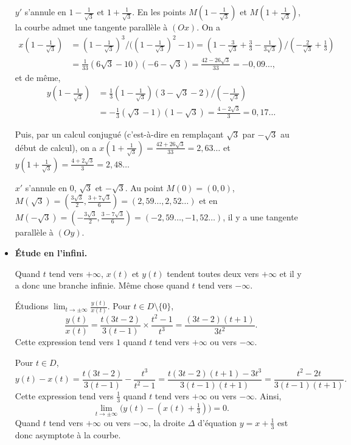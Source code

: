 \documentclass[class=report,crop=false]{standalone}
\begin{document}
\begin{exemple}
\begin{itemize}
$y'$ s'annule en $1-\frac{1}{\sqrt{3}}$ et $1+\frac{1}{\sqrt{3}}$.
En les points $M(1-\frac{1}{\sqrt{3}})$ et $M(1+\frac{1}{\sqrt{3}})$, la
courbe admet une tangente parallèle à $(Ox)$. On a
\begin{align*}
x\left(1-\tfrac{1}{\sqrt{3}}\right)&=\left(1-\tfrac{1}{\sqrt{3}}\right)^3/\Big(\left(1-\tfrac{1}{\sqrt{3}}\right)^2-1\Big)
=\left(1-\tfrac{3}{\sqrt{3}}+\tfrac{3}{3}-\tfrac{1}{3\sqrt{3}}\right)/\left(-\tfrac{2}{\sqrt{3}}+\tfrac{1}{3}\right)\\
 &=\tfrac{1}{33}\left(6\sqrt{3}-10\right)\left(-6-\sqrt{3}\right)=\frac{42-26\sqrt{3}}{33}=-0,09\ldots,
\end{align*}
et de même,
\begin{align*}
y\left(1-\tfrac{1}{\sqrt{3}}\right)
&=\tfrac{1}{3}\left(1-\tfrac{1}{\sqrt{3}}\right)\left(3-\sqrt{3}-2\right)/\left(-\tfrac{1}{\sqrt{3}}\right)\\
&=-\tfrac{1}{3}\left(\sqrt{3}-1\right)\left(1-\sqrt{3}\right)=\frac{4-2\sqrt{3}}{3}=0,17\ldots
\end{align*}

Puis, par un calcul conjugué (c'est-à-dire en remplaçant $\sqrt{3}$
par $-\sqrt{3}$ au début de calcul), on a
$x(1+\frac{1}{\sqrt{3}})=\frac{42+26\sqrt{3}}{33}
=2,63\ldots$ et $y(1+\frac{1}{\sqrt{3}})=\frac{4+2\sqrt{3}}{3}=2,48\ldots$

\medskip

$x'$ s'annule en $0$, $\sqrt{3}$ et $-\sqrt{3}$. Au point
$M(0)=(0,0)$, $M(\sqrt{3})=(\frac{3\sqrt{3}}{2},\frac{3+7\sqrt{3}}{6})
=(2,59\ldots,2,52\ldots)$ et en
$M(-\sqrt{3})=(-\frac{3\sqrt{3}}{2},\frac{3-7\sqrt{3}}{6})
=(-2,59\ldots,-1,52\ldots)$, il y a une tangente parallèle à $(Oy)$.


\item \textbf{Étude en l'infini.}

Quand $t$ tend vers $+\infty$, $x(t)$ et $y(t)$ tendent
toutes deux vers $+\infty$ et il y a donc une branche infinie.
Même chose quand $t$ tend vers $-\infty$.

Étudions $\lim_{t \to \pm\infty}\frac{y(t)}{x(t)}$.
Pour $t\in D\setminus\{0\}$,
$$\frac{y(t)}{x(t)}
=\frac{t(3t-2)}{3(t-1)}\times\frac{t^2-1}{t^3}=\frac{(3t-2)(t+1)}{3t^2}.$$
Cette expression tend vers $1$ quand $t$ tend vers $+\infty$ ou
vers $-\infty$.

Pour $t\in D$,
$$y(t)-x(t)=\frac{t(3t-2)}{3(t-1)}-\frac{t^3}{t^2-1}
=\frac{t(3t-2)(t+1)-3t^3}{3(t-1)(t+1)}=\frac{t^2-2t}{3(t-1)(t+1)}.$$
Cette expression tend vers $\frac{1}{3}$
quand $t$ tend vers $+\infty$ ou vers $-\infty$. Ainsi,
$$\lim_{t\rightarrow\pm\infty}\big(y(t)-(x(t)+\tfrac{1}{3})\big)=0.$$
Quand $t$ tend vers $+\infty$ ou vers $-\infty$, la droite
$\Delta$ d'équation $y=x+\frac{1}{3}$ est donc asymptote à la courbe.


\end{itemize}
\end{exemple}
\end{document}
